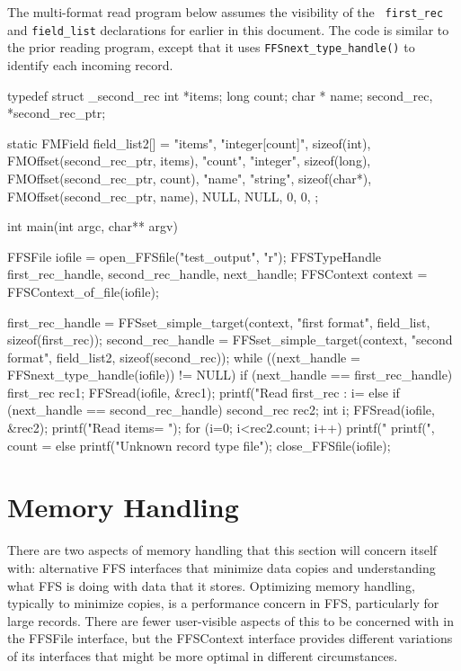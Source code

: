 The multi-format read program below assumes the visibility of the {\tt
  first\_rec} and {\tt field\_list} declarations for earlier in this
document.  The code is similar to the prior reading program, except that it
uses {\tt FFSnext\_type\_handle()} to identify each incoming record.
\begin{Code}
typedef struct _second_rec {
    int         *items;
    long        count;
    char *      name;
} second_rec, *second_rec_ptr;

static FMField field_list2[] = {
    {"items", "integer[count]", sizeof(int), FMOffset(second_rec_ptr, items)},
    {"count", "integer", sizeof(long), FMOffset(second_rec_ptr, count)},
    {"name", "string",   sizeof(char*), FMOffset(second_rec_ptr, name)},
    {NULL, NULL, 0, 0},
};

int
main(int argc, char** argv)
{
    FFSFile iofile = open_FFSfile("test_output", "r");
    FFSTypeHandle first_rec_handle, second_rec_handle, next_handle;
    FFSContext context = FFSContext_of_file(iofile);

    first_rec_handle = FFSset_simple_target(context, "first format", field_list, sizeof(first_rec));
    second_rec_handle = FFSset_simple_target(context, "second format", field_list2, sizeof(second_rec));
    while ((next_handle = FFSnext_type_handle(iofile)) != NULL) {
	if (next_handle == first_rec_handle) {
	    first_rec rec1;
	    FFSread(iofile, &rec1);
	    printf("Read first_rec : i=%
	} else 	if (next_handle == second_rec_handle) {
	    second_rec rec2;
	    int i;
	    FFSread(iofile, &rec2);
	    printf("Read items= ");
	    for (i=0; i<rec2.count; i++) printf("%
	    printf(", count = %
	} else {
	    printf("Unknown record type file\n");
	}
    }
    close_FFSfile(iofile);
}
\end{Code}
\section{Memory Handling}
There are two aspects of memory handling that this section will concern
itself with:  alternative FFS interfaces that minimize data copies and
understanding what FFS is doing with data that it stores.
Optimizing memory handling, typically to minimize copies, is a performance
concern in FFS, particularly for large records.  There are fewer
user-visible aspects of this to be concerned with in the FFSFile interface,
but the FFSContext interface provides different variations of its interfaces
that might be more optimal in different circumstances.

